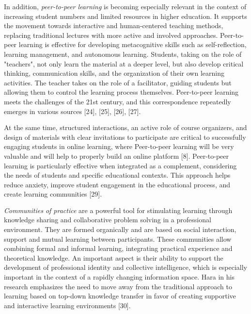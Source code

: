 In addition, \emph{peer-to-peer learning} is becoming especially
relevant in the context of increasing student numbers and limited
resources in higher education. It supports the movement towards
interactive and human-centered teaching methods, replacing traditional
lectures with more active and involved approaches. Peer-to-peer learning
is effective for developing metacognitive skills such as
self-reflection, learning management, and autonomous learning. Students,
taking on the role of "teachers", not only learn the material at a
deeper level, but also develop critical thinking, communication skills,
and the organization of their own learning activities. The teacher takes
on the role of a facilitator, guiding students but allowing them to
control the learning process themselves. Peer-to-peer learning meets the
challenges of the 21st century, and this correspondence repeatedly
emerges in various sources {[}24{]}, {[}25{]}, {[}26{]}, {[}27{]}.

At the same time, structured interactions, an active role of course
organizers, and design of materials with clear invitations to
participate are critical to successfully engaging students in online
learning, where Peer-to-peer learning will be very valuable and will
help to properly build an online platform {[}8{]}. Peer-to-peer learning
is particularly effective when integrated as a complement, considering
the needs of students and specific educational contexts. This approach
helps reduce anxiety, improve student engagement in the educational
process, and create learning communities {[}29{]}.

\emph{Communities of practice} are a powerful tool for stimulating
learning through knowledge sharing and collaborative problem solving in
a professional environment. They are formed organically and are based on
social interaction, support and mutual learning between participants.
These communities allow combining formal and informal learning,
integrating practical experience and theoretical knowledge. An important
aspect is their ability to support the development of professional
identity and collective intelligence, which is especially important in
the context of a rapidly changing information space. Hara in his
research emphasizes the need to move away from the traditional approach
to learning based on top-down knowledge transfer in favor of creating
supportive and interactive learning environments {[}30{]}.

